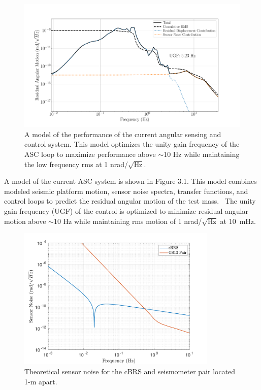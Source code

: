 \documentclass [12pt, proquest]{uwthesis}[2019]
\begin{document}
\begin{figure}[!h]
\begin{center}
\includegraphics[width=\textwidth]{cBRS_ASC_Without.pdf}
\caption[Model of the performance of the current angular sensing and control system]{A model of the performance of the current angular sensing and control system. This model optimizes the unity gain frequency of the ASC loop to maximize performance above $\sim$10 Hz while maintaining the low frequency rms at 1 nrad/$\sqrt{\text{Hz}}$.}
\label{ascWithout}
\end{center}
\end{figure}

A model of the current ASC system is shown in Figure 3.1. This model combines modeled seismic platform motion, sensor noise spectra, transfer functions, and control loops to predict the residual angular motion of the test mass.~\cite{ascModel} The unity gain frequency (UGF) of the control is optimized to minimize residual angular motion above $\sim$10 Hz while maintaining rms motion of 1 nrad/$\sqrt{\text{Hz}}$ at 10~mHz.

\begin{figure}[!h]
\begin{center}
\includegraphics[width=0.85\textwidth]{sensorNoise.pdf}
\caption[Theoretical sensor noise for the cBRS and seismometer pair]{Theoretical sensor noise for the cBRS and seismometer pair located 1-m apart.}
\label{sensNoise}
\end{center}
\end{figure}
\end{document}
